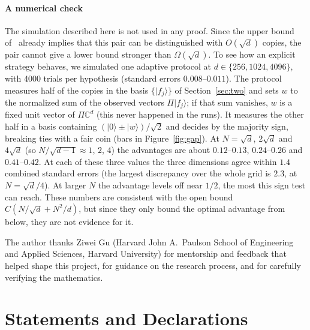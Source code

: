 \documentclass[pdflatex,sn-mathphys-num]{sn-jnl}%
\theoremstyle{thmstyleone}
\theoremstyle{thmstylethree}
\theoremstyle{thmstyletwo}
\newcommand{\ket}[1]{|#1\rangle}
\newcommand{\C}{\mathbb{C}}
\begin{document}
\paragraph{A numerical check} The simulation described here is not used in any proof. Since the upper bound
of~\cite{du} already implies that this pair can be distinguished with $O(\sqrt d)$ copies, the pair cannot give a lower
bound stronger than $\Omega(\sqrt d)$. To see how an explicit strategy behaves, we simulated one adaptive protocol at
$d\in\{256,1024,4096\}$, with 4000 trials per hypothesis (standard errors $0.008$--$0.011$). The protocol measures half
of the copies in the basis $\{\ket{f_j}\}$ of Section~\ref{sec:two} and sets $w$ to the normalized sum of the observed
vectors $\Pi\ket{f_j}$; if that sum vanishes, $w$ is a fixed unit vector of $\Pi\C^d$ (this never happened in the
runs). It measures the other half in a basis containing $(\ket0\pm\ket w)/\sqrt2$ and decides by the majority sign,
breaking ties with a fair coin (bars in Figure~\ref{fig:gap}). At $N=\sqrt d$, $2\sqrt d$ and $4\sqrt d$ (so
$N/\sqrt{d-1}\approx1$, $2$, $4$) the advantages are about $0.12$--$0.13$, $0.24$--$0.26$ and $0.41$--$0.42$. At each
of these three values the three dimensions agree within $1.4$ combined standard errors (the largest discrepancy over
the whole grid is $2.3$, at $N=\sqrt d/4$). At larger $N$ the advantage levels off near $1/2$, the most this sign test
can reach. These numbers are consistent with the open bound $C(N/\sqrt d+N^2/d)$, but since they only bound the optimal
advantage from below, they are not evidence for it.

\backmatter

The author thanks Ziwei Gu (Harvard John A.\ Paulson School of Engineering and Applied Sciences, Harvard University) for
mentorship and feedback that helped shape this project, for guidance on the research process, and for carefully
verifying the mathematics.

\section*{Statements and Declarations}
\end{document}
